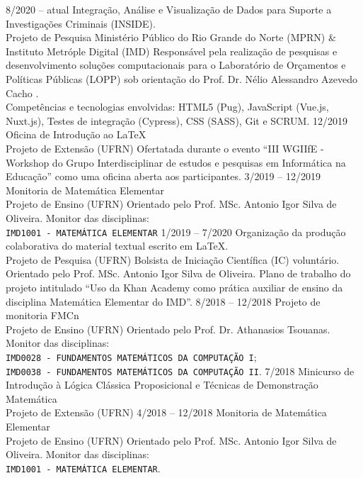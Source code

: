 \documentclass[9pt]{developercv}
\begin{document}
	\begin{entrylist}
		\entry
			{8/2020 -- atual}
			{Integração, Análise e Visualização de Dados para Suporte a Investigações Criminais (INSIDE).\\
				\footnotesize{Projeto de Pesquisa}}
		{Ministério Público do Rio Grande do Norte (MPRN) \& Instituto Metróple Digital (IMD)}
			{Responsável pela realização de pesquisas e desenvolvimento soluções computacionais para o Laboratório de Orçamentos e Políticas Públicas (LOPP) sob orientação do Prof. Dr. Nélio Alessandro Azevedo Cacho . \\
			Competências e tecnologias envolvidas: HTML5 (Pug), JavaScript (Vue.js, Nuxt.js), Testes de integração (Cypress), CSS (SASS), Git e SCRUM.}
		\entry
			{12/2019}
			{Oficina de Introdução ao \LaTeX{}\\
				\footnotesize{{Projeto de Extensão}}}
			{(UFRN)}
			{Ofertatada durante o evento ``III WGIIfE - Workshop do Grupo Interdisciplinar de estudos e pesquisas em Informática na Educação'' como uma oficina aberta aos participantes.}
		\entry
			{3/2019 -- 12/2019}
			{Monitoria de Matemática Elementar\\
				\footnotesize{Projeto de Ensino}}
			{(UFRN)}
			{Orientado pelo Prof. MSc. Antonio Igor Silva de Oliveira. Monitor das disciplinas:\\
				\texttt{IMD1001 - MATEMÁTICA ELEMENTAR}}
		\entry
			{1/2019 -- 7/2020}
			{Organização da produção colaborativa do material textual escrito em \LaTeX{}.\\
				\footnotesize{Projeto de Pesquisa}}
			{(UFRN)}
            {Bolsista de Iniciação Científica (IC) voluntário. Orientado pelo Prof. MSc. Antonio Igor Silva de Oliveira. Plano de trabalho do projeto intitulado ``Uso da Khan Academy como prática auxiliar de ensino da disciplina Matemática Elementar do IMD''.}
		\entry
			{8/2018 -- 12/2018}
			{Projeto de monitoria FMCn\\
				\footnotesize{Projeto de Ensino}}
			{(UFRN)}
			{Orientado pelo Prof. Dr. Athanasios Tsouanas. Monitor das disciplinas:\\
				\texttt{IMD0028 - FUNDAMENTOS MATEMÁTICOS DA COMPUTAÇÃO I};\\
				\texttt{IMD0038 - FUNDAMENTOS MATEMÁTICOS DA COMPUTAÇÃO II}.}
		\entry
			{7/2018}
			{Minicurso de Introdução à Lógica Clássica Proposicional e Técnicas de Demonstração Matemática\\
				\footnotesize{{Projeto de Extensão}}}
			{(UFRN)}
			{}
		\entry
			{4/2018 -- 12/2018}
			{Monitoria de Matemática Elementar\\
				\footnotesize{Projeto de Ensino}}
			{(UFRN)}
			{Orientado pelo Prof. MSc. Antonio Igor Silva de Oliveira. Monitor das disciplinas:\\
				\texttt{IMD1001 - MATEMÁTICA ELEMENTAR}.}
	\end{entrylist}
\end{document}
